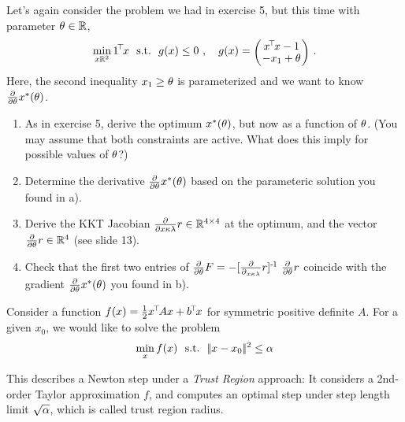 

\renewcommand{\course}{Optimization Algorithms}
\renewcommand{\coursepicture}{optim}
\renewcommand{\coursedate}{Winter 2024/25}
\renewcommand{\exnum}{Weekly Exercises 7}

\exercises


\exercisestitle



Let's again consider the problem we had in exercise 5, but this time with parameter $\theta\in{\mathbb{R}}$,
$$\min_{x\RRR^2} 1^\T x \st g(x) \le 0 \comma g(x) = \mat{c}{x^\T x - 1 \\ -x_1 + \t} ~.$$
Here, the second inequality $x_1 \ge \theta$ is parameterized and we want to know $\textstyle\frac{\partial}{\partial \theta} x^*(\theta)$.

\begin{enumerate}
\item As in exercise 5, derive the optimum $x^*(\theta)$, but now as a function of $\theta$. (You may assume that both constraints are active. What does this imply for possible values of $\theta$?)

\item Determine the derivative $\textstyle\frac{\partial}{\partial \theta} x^*(\theta)$ based on the parameteric solution you found in a).

\item Derive the KKT Jacobian $\textstyle\frac{\partial}{\partial x\kappa\lambda} r \in {\mathbb{R}}^{4\times 4}$ at the optimum, and the vector $\textstyle\frac{\partial}{\partial \theta} r \in {\mathbb{R}}^{4}$ (see slide 13).

\item Check that the first two entries of $\textstyle\frac{\partial}{\partial \theta} F = -[\textstyle\frac{\partial}{\partial {}_{x\kappa\lambda}} r]^{{\hspace*{-.0pt}\text{\rm -}\hspace*{-.5pt}}1}~ \textstyle\frac{\partial}{\partial \theta} r$ coincide with the gradient $\textstyle\frac{\partial}{\partial \theta} x^*(\theta)$ you found in b).
\end{enumerate}








Consider a function $f(x)=\frac{1}{2} x^{\!\top\!} A x + b^{\!\top\!} x$ for symmetric positive definite $A$. For a given $x_0$, we would like to solve the problem
$$\min_x f(x) ~~\text{s.t.}~~ |\!|x-x_0|\!|^2 \le \alpha$$

This describes a Newton step under a \emph{Trust Region} approach: It considers a 2nd-order Taylor approximation $f$, and computes an optimal step under step length limit $\sqrt{\alpha}$, which is called trust region radius.

